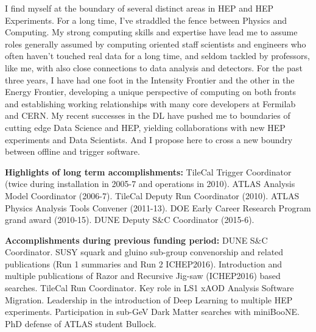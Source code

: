 %

I find myself at the boundary of several distinct areas in HEP and HEP
Experiments. For a long time, I've straddled the fence between Physics
and Computing.  My strong computing skills and expertise have lead me
to assume roles generally assumed by computing oriented staff
scientists and engineers who often haven't touched real data for a
long time, and seldom tackled by professors, like me, with also close
connections to data analysis and detectors.  For the past three years,
I have had one foot in the Intensity Frontier and the other in the
Energy Frontier, developing a unique perspective of computing on both
fronts and establishing working relationships with many core
developers at Fermilab and CERN. My recent successes in the DL have
pushed me to boundaries of cutting edge Data Science and HEP, yielding
collaborations with new HEP experiments and Data Scientists. And I
propose here to cross a new boundry between offline and trigger
software. 


{\bf Highlights of long term accomplishments:} TileCal Trigger
Coordinator (twice during installation in 2005-7 and operations in
2010). ATLAS Analysis Model Coordinator (2006-7). TileCal Deputy Run
Coordinator (2010). ATLAS Physics Analysis Tools Convener
(2011-13). DOE Early Career Research Program grand award
(2010-15). DUNE Deputy S\&C Coordinator (2015-6).

{\bf Accomplishments during previous funding period:} DUNE S\&C
Coordinator.  SUSY squark and gluino sub-group convenorship and
related publications (Run 1 summaries and Run 2
ICHEP2016). Introduction and multiple publications of Razor and
Recursive Jig-saw (ICHEP2016) based searches.  TileCal Run
Coordinator. Key role in LS1 xAOD Analysis Software Migration.
Leadership in the introduction of Deep Learning to multiple HEP
experiments. Participation in sub-GeV Dark Matter searches with
miniBooNE. PhD defense of ATLAS student Bullock.


